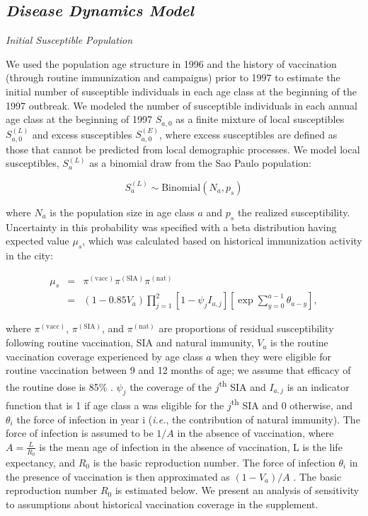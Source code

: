 \subsection{\texorpdfstring{\emph{Disease Dynamics
Model}}{Disease Dynamics Model}}\label{disease-dynamics-model}

\emph{Initial Susceptible Population}

We used the population age structure in 1996 and the history of vaccination (through routine immunization and campaigns) prior to 1997 to estimate the initial number of susceptible individuals in each age class at the beginning of the 1997 outbreak.  We modeled the number of susceptible individuals in each annual age class at the beginning of 1997 \(S_{a,0}\) as a finite mixture of local susceptibles \(S_{a,0}^{(L)}\) and excess susceptibles \(S_{a,0}^{(E)}\), where excess susceptibles are defined as those that cannot be predicted from local demographic processes.  We model local susceptibles, \(S_a^{(L)}\) as a binomial draw from the Sao Paulo population:

\[S_a^{(L)} \sim \text{Binomial}(N_a, p_s)\]

where \(N_a\) is the population size in age class \(a\) and \(p_s\) the realized susceptibility. Uncertainty in this probability was specified with a beta distribution having expected value \(\mu_s\), which was calculated based on historical immunization activity in the city:

\begin{eqnarray}
\mu_s &=& \pi^{(\text{vacc})} \pi^{(\text{SIA})}\pi^{(\text{nat})} \\
&=& (1- 0.85 V_a) \prod_{j=1}^2 \left[1- \psi_j I_{a,j} \right] \left[\exp \sum_{y=0}^{a-1} \theta_{a-y} \right],
\end{eqnarray}

where $\pi^{(\text{vacc})}$, $\pi^{(\text{SIA})}$, and $\pi^{(\text{nat})}$ are proportions of residual susceptibility following routine vaccination, SIA and natural immunity, \(V_a\) is the routine vaccination coverage experienced by age class \(a\) when they were eligible for routine vaccination between 9 and 12 months of age; we assume that efficacy of the routine dose is 85\% \cite{Uzicanin_2011}.  \(\psi_{j}\) the coverage of the \(j\)\textsuperscript{th} SIA and \(I_{a,j}\) is an indicator function that is 1 if age class a was eligible for the \(j\)\textsuperscript{th} SIA and 0 otherwise, and \(\theta_i\) the force of infection in year i (\emph{i.e.}, the contribution of natural immunity).  The force of infection is assumed to be \(1/A\) in the absence of vaccination, where \(A=\frac{L}{R_0}\) \cite{Anderson_1981} is the mean age of infection in the absence of vaccination, L is the life expectancy, and \(R_0\) is the basic reproduction number. The force of infection \(\theta_i\) in the presence of vaccination is then approximated as \((1-V_a)/A\) \cite{Anderson_1981}.  The basic reproduction number \(R_0\) is estimated below.  We present an analysis of sensitivity to assumptions about historical vaccination coverage in the supplement.

